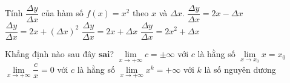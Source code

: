 \begin{ex}%
	Tính $\dfrac{\Delta y}{\Delta x}$ của hàm số $f(x)=x^2$ theo $x$ và $\Delta x$.
	\choice
	{$\dfrac{\Delta y}{\Delta x} = 2x-\Delta x$}
	{$\dfrac{\Delta y}{\Delta x} = 2x + (\Delta x)^2$}
	{\True $\dfrac{\Delta y}{\Delta x} = 2x + \Delta x$}
	{$\dfrac{\Delta y}{\Delta x} = 2x^2+ \Delta x$}
\end{ex}
\begin{ex}%
	Khẳng định nào sau đây $\textbf{sai}$?
	\choice
	{\True $\lim\limits_{x\rightarrow +\infty} c=\pm \infty$ với $c$ là hằng số}
	{$\lim\limits_{x\rightarrow x_{0}}x = x_{0}$}
	{$\lim\limits_{x\rightarrow +\infty} \dfrac{c}{x} = 0$ với $c$ là hằng số}
	{$\lim\limits_{x\rightarrow +\infty} x^k = +\infty$ với $k$ là số nguyên dương}
\end{ex}
